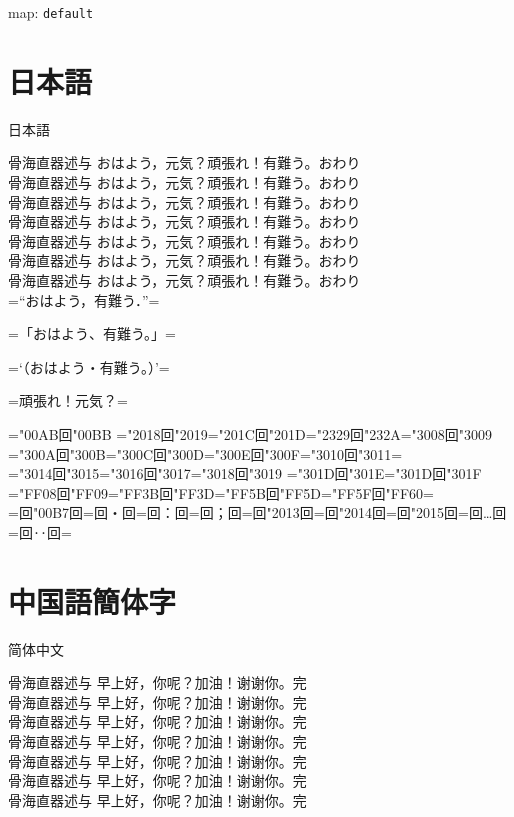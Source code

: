 \documentclass[landscape]{utarticle}
\def\map{default}
\begin{document}
\parindent0mm
map: \texttt{\map}

\section{日本語}
\upjpngtb 日本語

\upjpnrml 骨海直器述与 おはよう，元気？頑張れ！有難う。おわり\\
\upjpnrmm 骨海直器述与 おはよう，元気？頑張れ！有難う。おわり\\
\upjpnrmb 骨海直器述与 おはよう，元気？頑張れ！有難う。おわり\\
\upjpngtm 骨海直器述与 おはよう，元気？頑張れ！有難う。おわり\\
\upjpngtb 骨海直器述与 おはよう，元気？頑張れ！有難う。おわり\\
\upjpngte 骨海直器述与 おはよう，元気？頑張れ！有難う。おわり\\
\upjpngth 骨海直器述与 おはよう，元気？頑張れ！有難う。おわり\\

\upjpnrmm
=“おはよう，有難う．”=

=「おはよう、有難う。」=

=‘（おはよう・有難う。）’=

=頑張れ！元気？=

=\kchar"00AB回\kchar"00BB%
=\kchar"2018回\kchar"2019=\kchar"201C回\kchar"201D=\kchar"2329回\kchar"232A=\kchar"3008回\kchar"3009%
=\kchar"300A回\kchar"300B=\kchar"300C回\kchar"300D=\kchar"300E回\kchar"300F=\kchar"3010回\kchar"3011=\\
=\kchar"3014回\kchar"3015=\kchar"3016回\kchar"3017=\kchar"3018回\kchar"3019%
=\kchar"301D回\kchar"301E=\kchar"301D回\kchar"301F%
=\kchar"FF08回\kchar"FF09=\kchar"FF3B回\kchar"FF3D=\kchar"FF5B回\kchar"FF5D=\kchar"FF5F回\kchar"FF60=\\
=回\kchar"00B7回=回・回=回：回=回；回=回\kchar"2013回=回\kchar"2014回=回\kchar"2015回=回…回=回‥回=


\section{中国語簡体字}
\upschgtb 简体中文

\upschrml 骨海直器述与 早上好，你呢？加油！谢谢你。完\\
\upschrmm 骨海直器述与 早上好，你呢？加油！谢谢你。完\\
\upschrmb 骨海直器述与 早上好，你呢？加油！谢谢你。完\\
\upschgtm 骨海直器述与 早上好，你呢？加油！谢谢你。完\\
\upschgtb 骨海直器述与 早上好，你呢？加油！谢谢你。完\\
\upschgte 骨海直器述与 早上好，你呢？加油！谢谢你。完\\
\upschgth 骨海直器述与 早上好，你呢？加油！谢谢你。完\\
\end{document}
